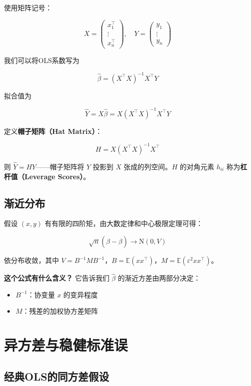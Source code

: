 使用矩阵记号：

\[
X = \begin{pmatrix} x_1^\top \\ \vdots \\ x_n^\top \end{pmatrix}, \quad
Y = \begin{pmatrix} y_1 \\ \vdots \\ y_n \end{pmatrix}
\]

我们可以将OLS系数写为

\[
\hat{\beta} = (X^\top X)^{-1} X^\top Y
\tag{B.10}
\]

拟合值为

\[
\hat{Y} = X\hat{\beta} = X(X^\top X)^{-1} X^\top Y
\tag{B.11}
\]

定义\textbf{帽子矩阵（Hat Matrix）}：

\[
H = X(X^\top X)^{-1} X^\top
\tag{B.12}
\]

则 $\hat{Y} = HY$——帽子矩阵将 $Y$ 投影到 $X$ 张成的列空间。$H$ 的对角元素 $h_{ii}$ 称为\textbf{杠杆值（Leverage Scores）}。

\subsection{渐近分布}\label{sec:B-asymptotic}

假设 $(x, y)$ 有有限的四阶矩，由大数定律和中心极限定理可得：

\[
\sqrt{n}(\hat{\beta} - \beta) \to \mathrm{N}(0, V)
\tag{B.13}
\]

依分布收敛，其中 $V = B^{-1} M B^{-1}$，$B = \mathbb{E}(x x^\top)$，$M = \mathbb{E}(\varepsilon^2 x x^\top)$。

\textbf{这个公式有什么含义？} 它告诉我们 $\hat{\beta}$ 的渐近方差由两部分决定：
\begin{itemize}
  \item $B^{-1}$：协变量 $x$ 的变异程度
  \item $M$：残差的加权协方差矩阵
\end{itemize}

\section{异方差与稳健标准误}\label{sec:B-heteroskedasticity}

\subsection{经典OLS的同方差假设}\label{sec:B-homoskedasticity}

